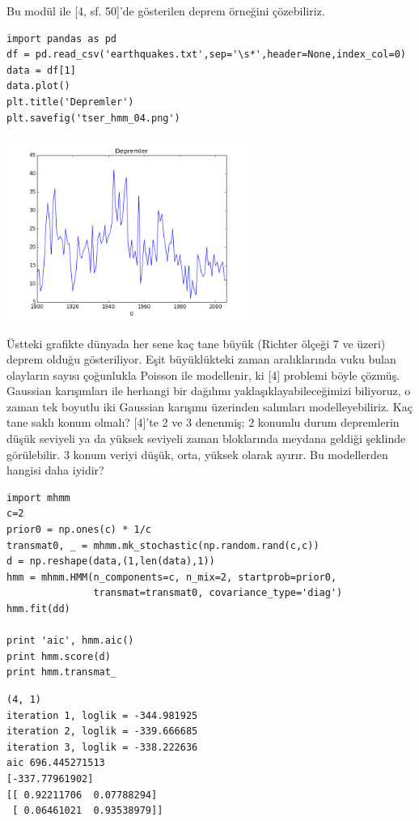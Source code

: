\documentclass[12pt,fleqn]{article}\usepackage{../../common}
\begin{document}
Bu modül ile [4, sf. 50]'de gösterilen deprem örneğini çözebiliriz.

\begin{verbatim}
import pandas as pd
df = pd.read_csv('earthquakes.txt',sep='\s*',header=None,index_col=0)
data = df[1]
data.plot()
plt.title('Depremler')
plt.savefig('tser_hmm_04.png')
\end{verbatim}

\includegraphics[height=6cm]{tser_hmm_04.png}

Üstteki grafikte dünyada her sene kaç tane büyük (Richter ölçeği 7 ve
üzeri) deprem olduğu gösteriliyor. Eşit büyüklükteki zaman aralıklarında
vuku bulan olayların sayısı çoğunlukla Poisson ile modellenir, ki [4]
problemi böyle çözmüş. Gaussian karışımları ile herhangi bir dağılımı
yaklaşıklayabileceğimizi biliyoruz, o zaman tek boyutlu iki Gaussian
karışımı üzerinden salımları modelleyebiliriz.  Kaç tane saklı konum
olmalı? [4]'te 2 ve 3 denenmiş; 2 konumlu durum depremlerin düşük seviyeli
ya da yüksek seviyeli zaman bloklarında meydana geldiği şeklinde
görülebilir. 3 konum veriyi düşük, orta, yüksek olarak ayırır. Bu
modellerden hangisi daha iyidir?

\begin{verbatim}
import mhmm
c=2
prior0 = np.ones(c) * 1/c
transmat0, _ = mhmm.mk_stochastic(np.random.rand(c,c))
d = np.reshape(data,(1,len(data),1))
hmm = mhmm.HMM(n_components=c, n_mix=2, startprob=prior0, 
               transmat=transmat0, covariance_type='diag')        
hmm.fit(dd)

print 'aic', hmm.aic()        
print hmm.score(d)
print hmm.transmat_
\end{verbatim}

\begin{verbatim}
(4, 1)
iteration 1, loglik = -344.981925
iteration 2, loglik = -339.666685
iteration 3, loglik = -338.222636
aic 696.445271513
[-337.77961902]
[[ 0.92211706  0.07788294]
 [ 0.06461021  0.93538979]]
\end{verbatim}
\end{document}
